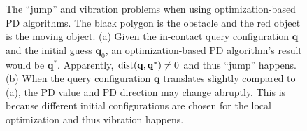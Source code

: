 \begin{figure}[!h]
\centering
\caption[The ``jump'' and vibration problems when using optimization-based PD algorithms]{The ``jump'' and vibration problems when using optimization-based PD algorithms. The black polygon is the obstacle and the red object is the moving object. (a) Given the in-contact query configuration $\mathbf q$ and the initial guess $\mathbf q_0$, an optimization-based PD algorithm's result would be $\mathbf q^*$. Apparently, $\operatorname{dist}(\mathbf q, \mathbf q^*) \neq 0$ and thus ``jump'' happens. (b) When the query configuration $\mathbf q$ translates slightly compared to (a), the PD value and PD direction may change abruptly. This is because different initial configurations are chosen for the local optimization and thus vibration happens. }\label{fig:2:local_artifact}
\end{figure}


